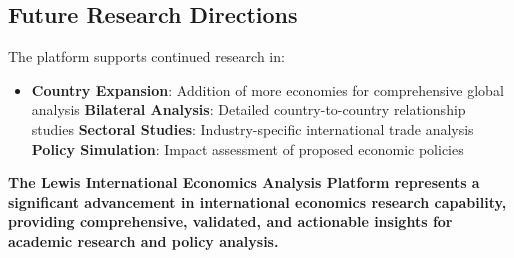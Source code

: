 \documentclass[11pt,a4paper]{article}
\begin{document}
\subsection{Future Research Directions}
The platform supports continued research in:

\begin{itemize}
    \item \textbf{Country Expansion}: Addition of more economies for comprehensive global analysis
    \textbf{Bilateral Analysis}: Detailed country-to-country relationship studies
    \textbf{Sectoral Studies}: Industry-specific international trade analysis
    \textbf{Policy Simulation}: Impact assessment of proposed economic policies
\end{itemize}

\begin{center}
\textbf{\large The Lewis International Economics Analysis Platform represents a significant advancement in international economics research capability, providing comprehensive, validated, and actionable insights for academic research and policy analysis.}
\end{center}
\end{document}

